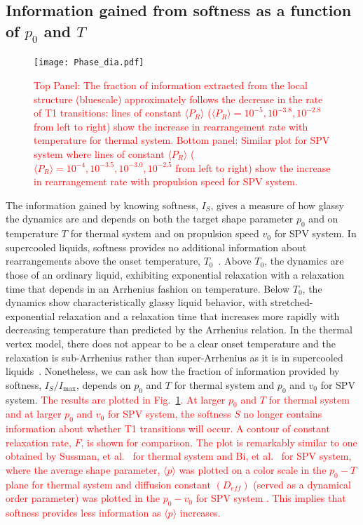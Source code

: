 \documentclass[twoside,twocolumn,9pt]{article}
\begin{document}
\subsection{Information gained from softness as a function of $p_0$ and $T$}
\begin{figure}%
\centering
  \texttt{[image: Phase\_dia.pdf]}
  \caption{\textcolor{red}{Top Panel: The fraction of information extracted from the local structure (bluescale) approximately follows the decrease in the rate of T1 transitions: lines of constant $\langle P_R \rangle$ ($\langle P_R \rangle = 10^{-5}, 10^{-3.8}, 10^{-2.8}$ from left to right) show the increase in rearrangement rate with temperature for thermal system. Bottom panel: Similar plot for SPV system where lines of constant $\langle P_R \rangle$ ($\langle P_R \rangle = 10^{-4}, 10^{-3.5}, 10^{-3.0}, 10^{-2.5}$ from left to right) show the increase in rearrangement rate with propulsion speed for SPV system.}} 
  \label{phasediagram}
\end{figure}
The information gained by knowing softness, $I_S$, gives a measure of how glassy the dynamics are and depends on both the target shape parameter $p_0$ and on temperature $T$ for thermal system and on propulsion speed $v_0$ for SPV system. In supercooled liquids, softness provides no additional information about rearrangements above the onset temperature, $T_0$~\cite{schoenholz2016a}. Above $T_0$, the dynamics are those of an ordinary liquid, exhibiting exponential relaxation with a relaxation time that depends in an Arrhenius fashion on temperature. Below $T_0$, the dynamics show characteristically glassy liquid behavior, with stretched-exponential relaxation and a relaxation time that increases more rapidly with decreasing temperature than predicted by the Arrhenius relation.  In the thermal vertex model, there does not appear to be a clear onset temperature and the relaxation is sub-Arrhenius rather than super-Arrhenius as it is in supercooled liquids~\cite{SussmanPaoluzziMarchetti2018}. Nonetheless, we can ask how the fraction of information provided by softness, $I_S / I_\text{max}$, depends on $p_0$ and $T$ for thermal system and $p_0$ and $v_0$ for SPV system.
\textcolor{red}{The results are plotted in Fig.~\ref{phasediagram}.
At larger $p_0$ and $T$ for thermal system and at larger $p_0$ and $v_0$ for SPV system, the softness $S$ no longer contains information about whether T1 transitions will occur.
A contour of constant relaxation rate, $F$, is shown for comparison. The plot is remarkably similar to one obtained by Sussman, et al.~\cite{SussmanPaoluzziMarchetti2018} for thermal system and Bi, et al.~\cite{bi2} for SPV system, where the average shape parameter, $\langle p \rangle$ was plotted on a color scale in the $p_0-T$ plane for thermal system and diffusion constant $(D_{eff})$ (served as a dynamical order parameter) was plotted in the $p_0-v_0$ for SPV system . This implies that softness provides less information as $\langle p \rangle$ increases.}
\end{document}

